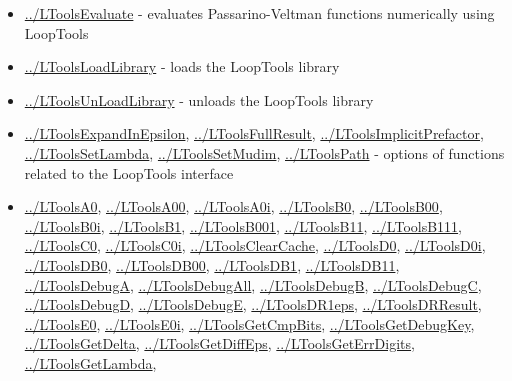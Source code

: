 \documentclass[../FeynHelpersManual.tex]{subfiles}
\begin{document}
\begin{itemize}
\tightlist
\item
  \hyperlink{../ltoolsevaluate}{../LToolsEvaluate} - evaluates
  Passarino-Veltman functions numerically using LoopTools
\item
  \hyperlink{../ltoolsloadlibrary}{../LToolsLoadLibrary} - loads the
  LoopTools library
\item
  \hyperlink{../ltoolsunloadlibrary}{../LToolsUnLoadLibrary} - unloads
  the LoopTools library
\item
  \hyperlink{../ltoolsexpandinepsilon}{../LToolsExpandInEpsilon},
  \hyperlink{../ltoolsfullresult}{../LToolsFullResult},
  \hyperlink{../ltoolsimplicitprefactor}{../LToolsImplicitPrefactor},
  \hyperlink{../ltoolssetlambda}{../LToolsSetLambda},
  \hyperlink{../ltoolssetmudim}{../LToolsSetMudim},
  \hyperlink{../ltoolspath}{../LToolsPath} - options of functions
  related to the LoopTools interface
\item
  \hyperlink{../ltoolsa0}{../LToolsA0},
  \hyperlink{../ltoolsa00}{../LToolsA00},
  \hyperlink{../ltoolsa0i}{../LToolsA0i},
  \hyperlink{../ltoolsb0}{../LToolsB0},
  \hyperlink{../ltoolsb00}{../LToolsB00},
  \hyperlink{../ltoolsb0i}{../LToolsB0i},
  \hyperlink{../ltoolsb1}{../LToolsB1},
  \hyperlink{../ltoolsb001}{../LToolsB001},
  \hyperlink{../ltoolsb11}{../LToolsB11},
  \hyperlink{../ltoolsb111}{../LToolsB111},
  \hyperlink{../ltoolsc0}{../LToolsC0},
  \hyperlink{../ltoolsc0i}{../LToolsC0i},
  \hyperlink{../ltoolsclearcache}{../LToolsClearCache},
  \hyperlink{../ltoolsd0}{../LToolsD0},
  \hyperlink{../ltoolsd0i}{../LToolsD0i},
  \hyperlink{../ltoolsdb0}{../LToolsDB0},
  \hyperlink{../ltoolsdb00}{../LToolsDB00},
  \hyperlink{../ltoolsdb1}{../LToolsDB1},
  \hyperlink{../ltoolsdb11}{../LToolsDB11},
  \hyperlink{../ltoolsdebuga}{../LToolsDebugA},
  \hyperlink{../ltoolsdebugall}{../LToolsDebugAll},
  \hyperlink{../ltoolsdebugb}{../LToolsDebugB},
  \hyperlink{../ltoolsdebugc}{../LToolsDebugC},
  \hyperlink{../ltoolsdebugd}{../LToolsDebugD},
  \hyperlink{../ltoolsdebuge}{../LToolsDebugE},
  \hyperlink{../ltoolsdr1eps}{../LToolsDR1eps},
  \hyperlink{../ltoolsdrresult}{../LToolsDRResult},
  \hyperlink{../ltoolse0}{../LToolsE0},
  \hyperlink{../ltoolse0i}{../LToolsE0i},
  \hyperlink{../ltoolsgetcmpbits}{../LToolsGetCmpBits},
  \hyperlink{../ltoolsgetdebugkey}{../LToolsGetDebugKey},
  \hyperlink{../ltoolsgetdelta}{../LToolsGetDelta},
  \hyperlink{../ltoolsgetdiffeps}{../LToolsGetDiffEps},
  \hyperlink{../ltoolsgeterrdigits}{../LToolsGetErrDigits},
  \hyperlink{../ltoolsgetlambda}{../LToolsGetLambda},

\end{itemize}
\end{document}
